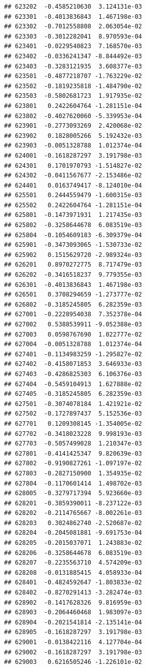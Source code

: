 \begin{frame}[fragile]
\begin{verbatim}
## 623202  -0.4585210630  3.124131e-03
## 623301  -0.4013836843  1.467198e-03
## 623302  -0.7012558808  2.063054e-02
## 623303  -0.3012282041  8.970593e-04
## 623401  -0.0229540823  7.168570e-03
## 623402  -0.0336241347 -8.844492e-03
## 623403  -0.3283121935  3.608377e-03
## 623501  -0.4877218707 -1.763229e-02
## 623502  -0.1819235818 -1.484790e-02
## 623503  -0.5802681723  1.917935e-02
## 623801   0.2422604764 -1.281151e-04
## 623802  -0.4027620060 -5.339953e-04
## 623901  -0.2773093269  2.420068e-02
## 623902   0.1828005266  5.192432e-03
## 623903  -0.0051328788  1.012374e-04
## 624001  -0.1618287297  3.191798e-03
## 624301   0.1701970793 -1.514827e-02
## 624302  -0.0411567677 -2.153486e-02
## 624401   0.0163749417 -8.124010e-04
## 625501   0.2444559479 -1.600315e-03
## 625502   0.2422604764 -1.281151e-04
## 625801  -0.1473971931  1.217435e-03
## 625802  -0.3258644678  6.083519e-03
## 625804  -0.1054609183 -6.309379e-04
## 625901  -0.3473093065 -1.530733e-02
## 625902   0.1515629720 -2.989324e-03
## 626201   0.8970272775  8.717479e-03
## 626202  -0.3416518237  9.779355e-03
## 626301  -0.4013836843  1.467198e-03
## 626501   0.3708294659 -1.273777e-02
## 626802  -0.3185245805  6.282359e-03
## 627001  -0.2228954038  7.352378e-04
## 627002   0.5388539911 -9.052388e-03
## 627003   0.0598767690  1.022777e-02
## 627004  -0.0051328788  1.012374e-04
## 627401  -0.1134983259 -1.295827e-02
## 627402  -0.4158071853  3.646933e-03
## 627403  -0.4286825303  6.106376e-03
## 627404  -0.5459104913  1.627888e-02
## 627405  -0.3185245805  6.282359e-03
## 627501  -0.3074078184  1.421921e-02
## 627502  -0.1727897437  5.152536e-03
## 627701   0.1209308145 -1.354005e-02
## 627702  -0.3418023228  9.998193e-03
## 627703  -0.5057499028  1.210347e-03
## 627801  -0.4141425347  9.820639e-03
## 627802  -0.9190827261 -1.097197e-02
## 627803  -0.2827150900  1.354935e-02
## 627804  -0.1170601414  1.498702e-03
## 628005  -0.3279717394  5.923660e-03
## 628201  -0.3859390011 -8.237122e-03
## 628202  -0.2114765667 -8.002261e-03
## 628203   0.3024862740 -2.520687e-02
## 628204  -0.2045081881 -9.691753e-04
## 628205  -0.2015037071  1.243883e-02
## 628206  -0.3258644678  6.083519e-03
## 628207  -0.2235563710  4.574209e-03
## 628208  -0.0131885415  4.058933e-04
## 628401  -0.4824592647 -1.803833e-02
## 628402  -0.8270291413 -3.282474e-03
## 628902  -0.1417628326  9.816959e-03
## 628903  -0.2064460468  1.983097e-03
## 628904  -0.2021541814 -2.135141e-04
## 628905  -0.1618287297  3.191798e-03
## 629001  -0.0138422116  4.127704e-04
## 629002  -0.1618287297  3.191798e-03
## 629003   0.6216505246 -1.226101e-02

\end{verbatim}
\end{frame}

